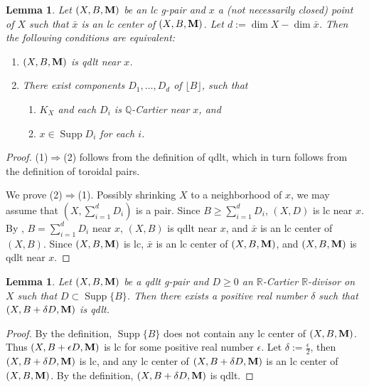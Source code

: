\documentclass[11pt]{amsart}
\numberwithin{equation}{section}
\newcommand{\Mm}{{\bf{M}}}
\newcommand{\Qq}{\mathbb{Q}}
\newcommand{\Rr}{\mathbb{R}}
\newcommand{\Supp}{\operatorname{Supp}}
\newtheorem{lem}[thm]{Lemma}
\theoremstyle{definition}
\theoremstyle{definition}
\theoremstyle{definition}
\begin{document}
\begin{lem}\label{lem: qdlt equivalent definition}
Let $(X,B,\Mm)$ be an lc g-pair and $x$ a (not necessarily closed) point of $X$ such that $\bar x$ is an lc center of $(X,B,\Mm)$. Let $d:=\dim X-\dim \bar x$. Then the following conditions are equivalent:
\begin{enumerate}
  \item $(X,B,\Mm)$ is qdlt near $x$.
  \item There exist components $D_1,\dots,D_{d}$ of $\lfloor B\rfloor$, such that 
  \begin{enumerate}
      \item $K_X$ and each $D_i$ is $\Qq$-Cartier near $x$, and
      \item $x\in\Supp D_i$ for each $i$.
  \end{enumerate}
\end{enumerate}
\end{lem}
\begin{proof}
(1)$\Rightarrow$(2) follows from the definition of qdlt, which in turn follows from the definition of toroidal pairs. 
    
We prove (2)$\Rightarrow$(1). Possibly shrinking $X$ to a neighborhood of $x$, we may assume that $(X,\sum_{i=1}^{d}D_i)$ is a pair. Since $B\geq\sum_{i=1}^{d}D_i$, $(X,D)$ is lc near $x$. By \cite[Proposition 34]{dFKX17}, $B=\sum_{i=1}^dD_i$ near $x$, $(X,B)$ is qdlt near $x$, and $\bar x$ is an lc center of $(X,B)$. Since $(X,B,\Mm)$ is lc, $\bar x$ is an lc center of $(X,B,\Mm)$, and $(X,B,\Mm)$ is qdlt near $x$.
\end{proof}

\begin{lem}\label{lem: qdlt perturbation}
Let $(X,B,\Mm)$ be a qdlt g-pair and $D\geq 0$ an $\Rr$-Cartier $\Rr$-divisor on $X$ such that $D\subset\Supp\{B\}$. Then there exists a positive real number $\delta$ such that $(X,B+\delta D,\Mm)$ is qdlt.
\end{lem}
\begin{proof}
By the definition, $\Supp\{B\}$ does not contain any lc center of $(X,B,\Mm)$. Thus $(X,B+\epsilon D,\Mm)$ is lc for some positive real number $\epsilon$. Let $\delta:=\frac{\epsilon}{2}$, then $(X,B+\delta D,\Mm)$ is lc, and any lc center of $(X,B+\delta D,\Mm)$ is an lc center of $(X,B,\Mm)$. By the definition, $(X,B+\delta D,\Mm)$ is qdlt.
\end{proof}
\end{document}
